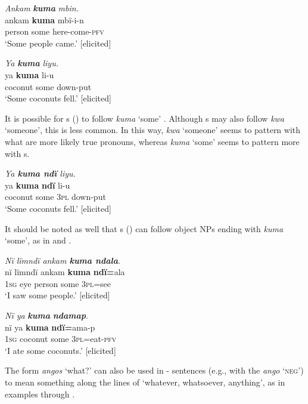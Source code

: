 \ea%
    \label{ex:pron:41}
          \textit{Ankam} \textbf{\textit{kuma}} \textit{mbin.}\\
\gll ankam  \textbf{kuma}  mbï-i-n\\
    person  some  here-come-\textsc{pfv}\\
\glt `Some people came.’ [elicited]
\z

\ea%
    \label{ex:pron:42}
         \textit{Ya} \textbf{\textit{kuma}} \textit{liyu.}\\
\gll ya      \textbf{kuma}  li-u\\
    coconut  some  down-put\\
\glt `Some coconuts fell.’ [elicited]
\z

It is possible for s () to follow \textit{kuma} ‘some’ . Although s may also follow \textit{kwa} ‘someone’, this is less common. In this way, \textit{kwa} ‘someone’ seems to pattern with what are more likely true pronouns, whereas \textit{kuma} ‘some’ seems to pattern more with s.

\ea%
    \label{ex:pron:43}
          \textit{Ya \textbf{kuma ndï} liyu.}\\
\gll    ya      \textbf{kuma}  \textbf{ndï}  li-u\\
    coconut  some  3\textsc{pl}  down-put\\
\glt `Some coconuts fell.’ [elicited]
\z

It should be noted as well that s () can follow object NPs ending with \textit{kuma} ‘some’, as in  and .

\ea%
    \label{ex:pron:44}
          \textit{Nï lïmndï ankam \textbf{kuma ndala}}.\\
\gll nï    lïmndï  ankam  \textbf{kuma}  \textbf{ndï=}ala\\
    1\textsc{sg}  eye    person  some  3\textsc{pl}=see\\
\glt `I saw some people.’ [elicited]
\z

\ea%
    \label{ex:pron:45}
         \textit{Nï ya} \textbf{\textit{kuma}} \textbf{\textit{ndamap}}.\\
\gll nï    ya      \textbf{kuma}  \textbf{ndï=}ama-p\\
    1\textsc{sg}  coconut  some  3\textsc{pl}=eat-\textsc{pfv}\\
\glt `I ate some coconuts.’ [elicited]
\z

The  form \textit{angos} ‘what?’ can also be used in - sentences (e.g., with the  \textit{ango} ‘\textsc{neg}’) to mean something along the lines of ‘whatever, whatsoever, anything’, as in examples  through .

